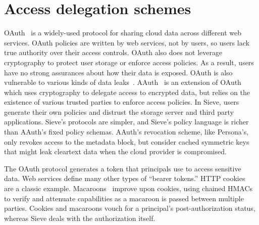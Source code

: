 \section{Access delegation schemes}


OAuth~\cite{oauth} is a widely-used protocol
for sharing cloud data across different web
services. OAuth policies are written by web
services, not by users, so users lack true
authority over their access controls. OAuth
also does not leverage cryptography to protect
user storage or enforce access policies. As a
result, users have no strong assurances about
how their data is exposed. OAuth is
also vulnerable to various kinds of data
leaks~\cite{oauthbugs, oauthbugs2}.
AAuth~\cite{aauth} is an extension of
OAuth which uses cryptography
to delegate access to encrypted data,
but relies on the existence
of various trusted parties to enforce
access policies. In Sieve, users
generate their own policies and distrust
the storage server and third party
applications. Sieve's protocols are 
simpler, and Sieve's policy
language is richer than AAuth's
fixed policy schemas. AAuth's revocation scheme,
like Persona's, only revokes access
to the metadata block, but consider
cached symmetric keys
that might leak cleartext data when
the cloud provider is compromised.

The OAuth protocol generates a token
that principals use to access sensitive
data. Web services define many other types
of ``bearer tokens.'' HTTP cookies~\cite{cookies}
are a classic example. Macaroons~\cite{macaroons}
improve upon cookies, using chained HMACs
to verify and attenuate capabilities as a
macaroon is passed between multiple parties.
Cookies and macaroons vouch for a principal's
post-authorization status, whereas Sieve
deals with the authorization itself.
